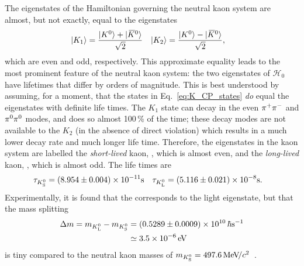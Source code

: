 The eigenstates of the Hamiltonian governing the neutral kaon system are almost, but not exactly, equal to the \CP eigenstates
\begin{align}\label{eq:K_CP_states}
    |K_1\rangle   &= \frac{|{{K}^0}\rangle + |{{\kern 0.18em\overline{\kern -0.18em K}}{}^0}\rangle}{\sqrt{2}} &
    |K_2\rangle   &= \frac{|{{K}^0}\rangle - |{{\kern 0.18em\overline{\kern -0.18em K}}{}^0}\rangle}{\sqrt{2}},
\end{align}
which are \CP even and odd, respectively. This approximate equality leads to the most prominent feature of the neutral kaon system: the two eigenstates of $\mathcal H_0$ have lifetimes that differ by orders of magnitude. This is best understood by assuming, for a moment, that the states in Eq.~\eqref{eq:K_CP_states} \emph{do} equal the eigenstates with definite life times. The $K_1$ state can decay in the \CP even ${{\pi}^+}{{\pi}^-}$ and ${{\pi}^0}{{\pi}^0}$ modes, and does so almost 100\,\% of the time; these decay modes are not available to the $K_2$ (in the absence of direct \CP violation) which results in a much lower decay rate and much longer life time. Therefore, the eigenstates in the kaon system are labelled the \emph{short-lived} kaon, \KS, which is almost \CP even, and the \emph{long-lived} kaon, \KL, which is almost \CP odd. The life times are~\cite{PDG2020}
\begin{align}
    \tau_{{K}^0_{\mathrm{S}}} &= (8.954\pm0.004)\times10^{-11} \text s &
    \tau_{{K}^0_{\mathrm{L}}} &= (5.116\pm0.021)\times10^{-8} \text s.
\end{align}
Experimentally, it is found that the \KS corresponds to the light eigenstate, but that the mass splitting~\cite{PDG2020}
\begin{align}
\begin{split}
    \Delta m = m_{{K}^0_{\mathrm{L}}}-m_{{K}^0_{\mathrm{S}}} &= (0.5289\pm0.0009)\times 10^{10} \,\hbar \text s^{-1}\\
    &\simeq 3.5\times 10^{-6} \text{\,e\kern -0.1em V}
\end{split}
\end{align}
is tiny compared to the neutral kaon masses of $m_{{K}^0_{\mathrm{S}}}=497.6\text{\,Me\kern -0.1em V\!/}c^2$~\cite{PDG2020}.


